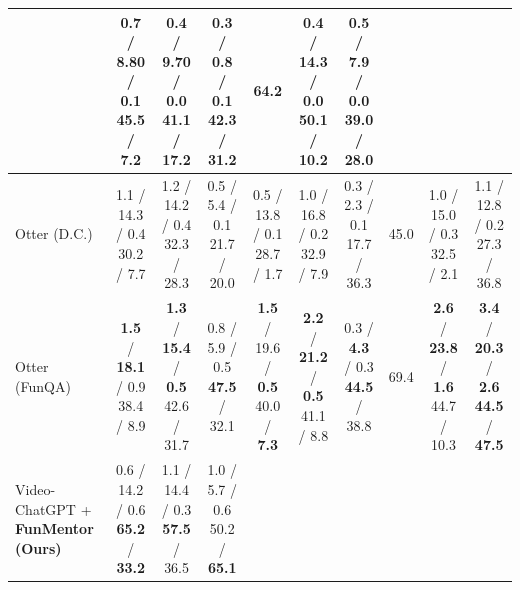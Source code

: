\begin{table}[h]
{{\begin{tabular}{l|ccc|cccc|cc}
& \makecell[c]{0.7 / 8.80 / 0.1 \\ 45.5 / 7.2}
& \makecell[c]{0.4 / 9.70 / 0.0 \\ 41.1 / 17.2}
& \makecell[c]{0.3 / 0.8 / 0.1 \\ 42.3 / 31.2}
& 64.2 

& \makecell[c]{0.4 / 14.3 / 0.0 \\ 50.1 / 10.2}
& \makecell[c]{0.5 / 7.9 / 0.0 \\ 39.0 / 28.0} \\

\toprule
Otter (D.C.) \cite{li2023otter}  
& \makecell[c]{1.1 / 14.3 / 0.4 \\ 30.2 / 7.7}
& \makecell[c]{1.2 / 14.2 / 0.4 \\ 32.3 / 28.3}
& \makecell[c]{0.5 / 5.4 / 0.1 \\ 21.7 / 20.0}

& \makecell[c]{0.5 / 13.8 / 0.1 \\ 28.7 / 1.7}
& \makecell[c]{1.0 / 16.8 / 0.2 \\32.9 / 7.9}
& \makecell[c]{0.3 / 2.3 / 0.1 \\ 17.7 / 36.3}
& 45.0

& \makecell[c]{1.0 / 15.0 / 0.3 \\ 32.5 / 2.1}
& \makecell[c]{1.1 / 12.8 / 0.2 \\ 27.3 / 36.8} \\
\toprule
Otter (FunQA) \cite{li2023otter} 
& \makecell[c]{\textbf{1.5} / \textbf{18.1} / 0.9 \\ 38.4 / 8.9}
& \makecell[c]{\textbf{1.3} / \textbf{15.4} / \textbf{0.5}\\ 42.6 / 31.7}
& \makecell[c]{0.8 / 5.9 /  0.5 \\ \textbf{47.5} / 32.1}

& \makecell[c]{\textbf{1.5} / 19.6 / \textbf{0.5} \\ 40.0 / \textbf{7.3}}
& \makecell[c]{\textbf{2.2} / \textbf{21.2} / \textbf{0.5} \\ 41.1 / 8.8}
& \makecell[c]{0.3 / \textbf{4.3} / 0.3 \\ \textbf{44.5} / 38.8}
& 69.4

& \makecell[c]{\textbf{2.6} / \textbf{23.8} / \textbf{1.6} \\ 44.7 / 10.3}
& \makecell[c]{\textbf{3.4} / \textbf{20.3} / \textbf{2.6} \\ \textbf{44.5} / \textbf{47.5}} \\
\midrule
\toprule
Video-ChatGPT \cite{maaz2023videochatgpt}  + \textbf{FunMentor (Ours)}
& \makecell[c]{0.6 / 14.2 / 0.6 \\ \textbf{65.2} / \textbf{33.2}}
& \makecell[c]{1.1 / 14.4 / 0.3 \\ \textbf{57.5} / 36.5}
& \makecell[c]{1.0 / 5.7 / 0.6 \\ 50.2 / \textbf{65.1}}


\end{tabular}}}
\end{table}
